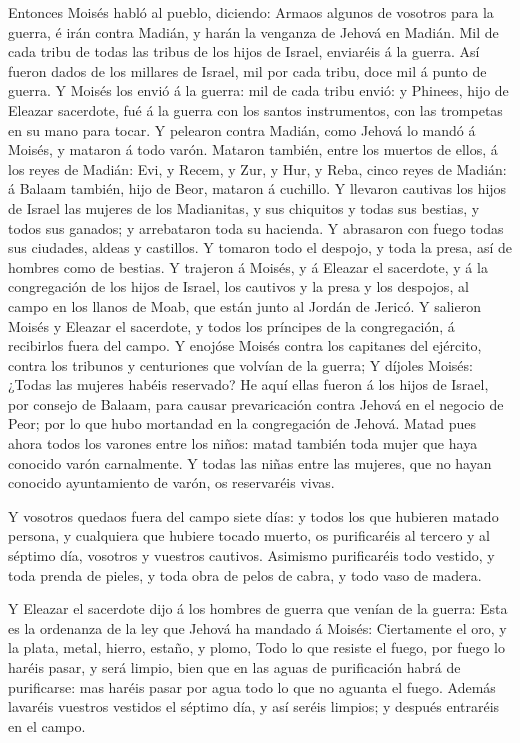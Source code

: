  Entonces Moisés habló al pueblo, diciendo: Armaos algunos
de vosotros para la guerra, é irán contra Madián, y harán la venganza de
Jehová en Madián.  Mil de cada tribu de todas las tribus de
los hijos de Israel, enviaréis á la guerra.  Así fueron
dados de los millares de Israel, mil por cada tribu, doce mil á punto de
guerra.  Y Moisés los envió á la guerra: mil de cada tribu
envió: y Phinees, hijo de Eleazar sacerdote, fué á la guerra con los
santos instrumentos, con las trompetas en su mano para tocar.
 Y pelearon contra Madián, como Jehová lo mandó á Moisés, y
mataron á todo varón.  Mataron también, entre los muertos de
ellos, á los reyes de Madián: Evi, y Recem, y Zur, y Hur, y Reba, cinco
reyes de Madián: á Balaam también, hijo de Beor, mataron á cuchillo.
 Y llevaron cautivas los hijos de Israel las mujeres de los
Madianitas, y sus chiquitos y todas sus bestias, y todos sus ganados; y
arrebataron toda su hacienda.  Y abrasaron con fuego todas
sus ciudades, aldeas y castillos.  Y tomaron todo el
despojo, y toda la presa, así de hombres como de bestias. 
Y trajeron á Moisés, y á Eleazar el sacerdote, y á la congregación de
los hijos de Israel, los cautivos y la presa y los despojos, al campo en
los llanos de Moab, que están junto al Jordán de Jericó.  Y
salieron Moisés y Eleazar el sacerdote, y todos los príncipes de la
congregación, á recibirlos fuera del campo.  Y enojóse
Moisés contra los capitanes del ejército, contra los tribunos y
centuriones que volvían de la guerra;  Y díjoles Moisés:
¿Todas las mujeres habéis reservado?  He aquí ellas fueron
á los hijos de Israel, por consejo de Balaam, para causar prevaricación
contra Jehová en el negocio de Peor; por lo que hubo mortandad en la
congregación de Jehová.  Matad pues ahora todos los varones
entre los niños: matad también toda mujer que haya conocido varón
carnalmente.  Y todas las niñas entre las mujeres, que no
hayan conocido ayuntamiento de varón, os reservaréis vivas.

 Y vosotros quedaos fuera del campo siete días: y todos los
que hubieren matado persona, y cualquiera que hubiere tocado muerto, os
purificaréis al tercero y al séptimo día, vosotros y vuestros cautivos.
 Asimismo purificaréis todo vestido, y toda prenda de
pieles, y toda obra de pelos de cabra, y todo vaso de madera.

 Y Eleazar el sacerdote dijo á los hombres de guerra que
venían de la guerra: Esta es la ordenanza de la ley que Jehová ha
mandado á Moisés:  Ciertamente el oro, y la plata, metal,
hierro, estaño, y plomo,  Todo lo que resiste el fuego, por
fuego lo haréis pasar, y será limpio, bien que en las aguas de
purificación habrá de purificarse: mas haréis pasar por agua todo lo que
no aguanta el fuego.  Además lavaréis vuestros vestidos el
séptimo día, y así seréis limpios; y después entraréis en el campo.

